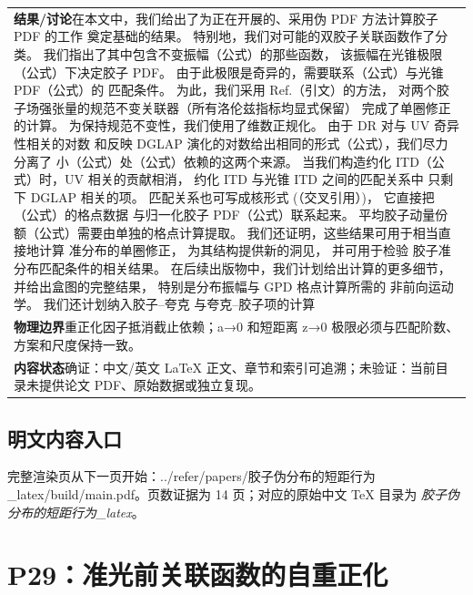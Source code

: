 \documentclass[UTF8,11pt,oneside]{ctexbook}
\begin{document}
\begin{table}[htbp]
\begin{tabular}{@{}p{}@{}}
    \textbf{结果/讨论}\quad 在本文中，我们给出了为正在开展的、采用伪 PDF 方法计算胶子 PDF 的工作 奠定基础的结果。 特别地，我们对可能的双胶子关联函数作了分类。 我们指出了其中包含不变振幅（公式）的那些函数， 该振幅在光锥极限（公式）下决定胶子 PDF。 由于此极限是奇异的，需要联系（公式）与光锥 PDF（公式）的 匹配条件。 为此，我们采用 Ref.（引文）的方法， 对两个胶子场强张量的规范不变关联器（所有洛伦兹指标均显式保留） 完成了单圈修正的计算。 为保持规范不变性，我们使用了维数正规化。 由于 DR 对与 UV 奇异性相关的对数 和反映 DGLAP 演化的对数给出相同的形式（公式），我们尽力分离了 小（公式）处（公式）依赖的这两个来源。 当我们构造约化 ITD（公式）时，UV 相关的贡献相消， 约化 ITD 与光锥 ITD 之间的匹配关系中 只剩下 DGLAP 相关的项。 匹配关系也可写成核形式 (（交叉引用）)， 它直接把（公式）的格点数据 与归一化胶子 PDF（公式）联系起来。 平均胶子动量份额（公式）需要由单独的格点计算提取。 我们还证明，这些结果可用于相当直接地计算 准分布的单圈修正， 为其结构提供新的洞见， 并可用于检验 胶子准分布匹配条件的相关结果。 在后续出版物中，我们计划给出计算的更多细节， 并给出盒图的完整结果， 特别是分布振幅与 GPD 格点计算所需的 非前向运动学。 我们还计划纳入胶子–夸克 与夸克–胶子项的计算 \\
    \textbf{物理边界}\quad 重正化因子抵消截止依赖；a→0 和短距离 z→0 极限必须与匹配阶数、方案和尺度保持一致。 \\
    \textbf{内容状态}\quad 确证：中文/英文 LaTeX 正文、章节和索引可追溯；未验证：当前目录未提供论文 PDF、原始数据或独立复现。 \\
    \bottomrule
  \end{tabular}
\end{table}
\section*{明文内容入口}
\noindent 完整渲染页从下一页开始：../\allowbreak{}refer/\allowbreak{}papers/\allowbreak{}胶子伪分布的短距行为\_\allowbreak{}latex/\allowbreak{}build/\allowbreak{}main.pdf。页数证据为 14 页；对应的原始中文 TeX 目录为 \emph{胶子伪分布的短距行为\_latex}。
\clearpage

\clearpage

\chapter{P29：准光前关联函数的自重正化}
\end{document}
